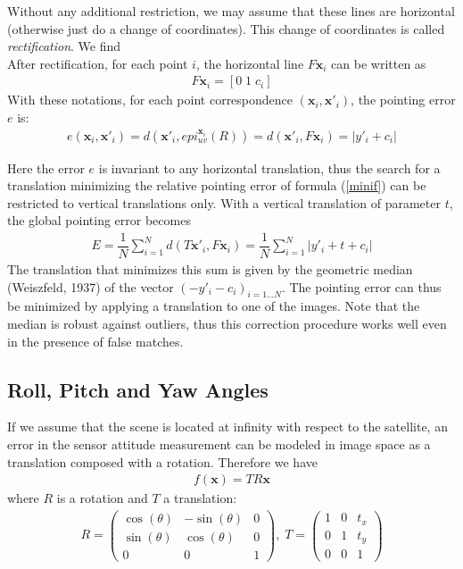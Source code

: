 \documentclass[paper=a4, fontsize=11pt, onecolumn, tikz, dvipsnames, svgnames, x11names]{article}
\begin{document}
Without any additional restriction, we may assume that these lines are horizontal (otherwise just do a change of coordinates). This change of coordinates is called \textit{rectification}. We find \\%

After rectification, for each point $i$, the horizontal line $F\textbf{x}_i$ can be written as
\begin{align*}
F\textbf{x}_i = \left[ 0 \; 1 \; c_i \right]
\end{align*}
With these notations, for each point correspondence $(\textbf{x}_i , \textbf{x}'_i)$, the pointing error $e$ is:
\begin{align*}
e(\textbf{x}_i, \textbf{x}'_i) = d(\textbf{x}'_i, epi^{\textbf{x}_i}_{u v}(R)) = d(\textbf{x}'_i, F\textbf{x}_i) = | y'_i + c_i|
\end{align*}

Here the error $e$ is invariant to any horizontal translation, thus the search for a translation minimizing the relative pointing error of formula (\ref{minif}) can be restricted to vertical translations only. With a vertical translation of parameter $t$, the global pointing error becomes
\begin{align*}
E = \dfrac{1}{N} \sum\limits_{i=1}^{N} d(T\textbf{x}'_i, F\textbf{x}_i) = \dfrac{1}{N} \sum\limits_{i=1}^{N} | y'_i + t+ c_i|
\end{align*}
The translation that minimizes this sum is given by the geometric median (Weiszfeld, 1937) of the vector $(-y'_i - c_i )_{i=1...N}$.  The pointing error can thus be minimized by applying a translation to one of the images. Note that the median is robust against outliers, thus this correction procedure works well even in the presence of false matches.


\subsection{Roll, Pitch and Yaw Angles}
If we assume that the scene is located at infinity with respect to the satellite, an error in the sensor attitude measurement can be modeled in image space as a translation composed with a rotation. Therefore we have
\begin{align*}
f(\textbf{x}) = TR\textbf{x}
\end{align*}
where $R$ is a rotation and $T$ a translation:\\
\begin{align*}
R =
\begin{pmatrix}
\cos(\theta) & -\sin(\theta) & 0 \\
\sin(\theta) & \cos(\theta) & 0 \\
0 & 0 & 1
\end{pmatrix}, \;
T =
\begin{pmatrix}
1 & 0 & t_x \\
0 & 1 & t_y \\
0 & 0 & 1
\end{pmatrix}
\end{align*}
\end{document}
